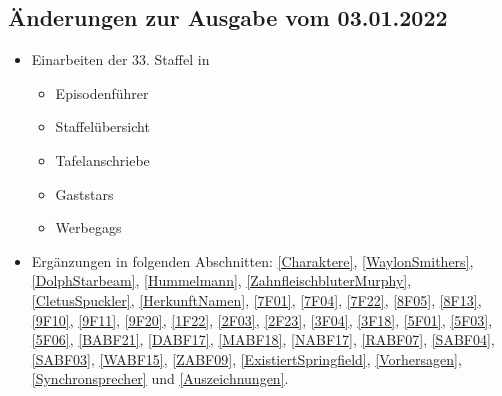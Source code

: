 \documentclass[pagesize,twoside,german]{scrbook}
\begin{document}
\subsection*{Änderungen zur Ausgabe vom 03.01.2022}
\begin{itemize}
	\item Einarbeiten der 33. Staffel in
	\begin{itemize}
		\item Episodenführer
		\item Staffelübersicht
		\item Tafelanschriebe
		\item Gaststars
		\item Werbegags
	\end{itemize}
	\item Ergänzungen in folgenden Abschnitten: \ref{Charaktere}, \ref{WaylonSmithers}, \ref{DolphStarbeam}, \ref{Hummelmann}, \ref{ZahnfleischbluterMurphy}, \ref{CletusSpuckler}, \ref{HerkunftNamen}, \ref{7F01}, \ref{7F04}, \ref{7F22}, \ref{8F05}, \ref{8F13}, \ref{9F10}, \ref{9F11}, \ref{9F20}, \ref{1F22}, \ref{2F03}, \ref{2F23}, \ref{3F04}, \ref{3F18}, \ref{5F01}, \ref{5F03}, \ref{5F06}, \ref{BABF21}, \ref{DABF17}, \ref{MABF18}, \ref{NABF17}, \ref{RABF07}, \ref{SABF04}, \ref{SABF03}, \ref{WABF15}, \ref{ZABF09}, \ref{ExistiertSpringfield}, \ref{Vorhersagen}, \ref{Synchronsprecher} und \ref{Auszeichnungen}.
\end{itemize}
\end{document}
